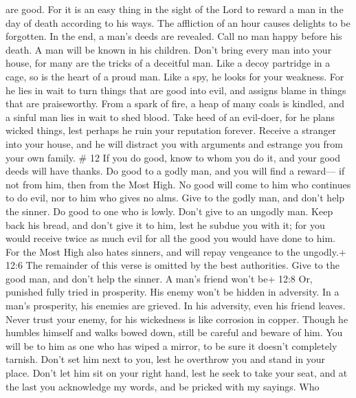 are good.  For it is an easy thing in the sight of the Lord
to reward a man in the day of death according to his ways. 
The affliction of an hour causes delights to be forgotten. In the end, a
man's deeds are revealed.  Call no man happy before his
death. A man will be known in his children.  Don't bring
every man into your house, for many are the tricks of a deceitful man.
 Like a decoy partridge in a cage, so is the heart of a
proud man. Like a spy, he looks for your weakness.  For he
lies in wait to turn things that are good into evil, and assigns blame
in things that are praiseworthy.  From a spark of fire, a
heap of many coals is kindled, and a sinful man lies in wait to shed
blood.  Take heed of an evil-doer, for he plans wicked
things, lest perhaps he ruin your reputation forever. 
Receive a stranger into your house, and he will distract you with
arguments and estrange you from your own family. \# 12  If
you do good, know to whom you do it, and your good deeds will have
thanks.  Do good to a godly man, and you will find a
reward--- if not from him, then from the Most High.  No good
will come to him who continues to do evil, nor to him who gives no alms.
 Give to the godly man, and don't help the sinner.
 Do good to one who is lowly. Don't give to an ungodly man.
Keep back his bread, and don't give it to him, lest he subdue you with
it; for you would receive twice as much evil for all the good you would
have done to him.  For the Most High also hates sinners, and
will repay vengeance to the ungodly.+ 12:6 The remainder of this verse
is omitted by the best authorities.  Give to the good man,
and don't help the sinner.  A man's friend won't be+ 12:8
Or, punished fully tried in prosperity. His enemy won't be hidden in
adversity.  In a man's prosperity, his enemies are grieved.
In his adversity, even his friend leaves.  Never trust your
enemy, for his wickedness is like corrosion in copper. 
Though he humbles himself and walks bowed down, still be careful and
beware of him. You will be to him as one who has wiped a mirror, to be
sure it doesn't completely tarnish.  Don't set him next to
you, lest he overthrow you and stand in your place. Don't let him sit on
your right hand, lest he seek to take your seat, and at the last you
acknowledge my words, and be pricked with my sayings.  Who
